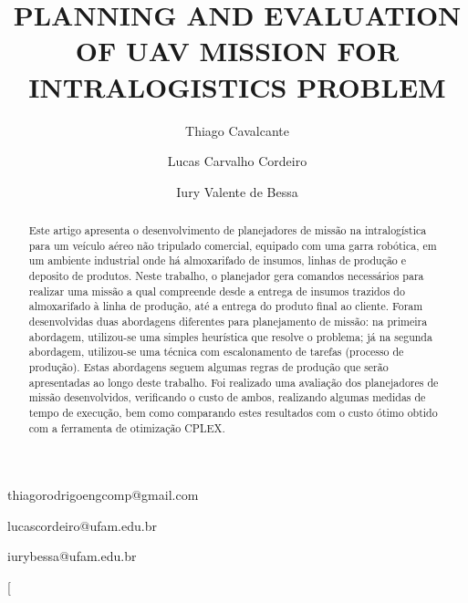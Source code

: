 \documentclass[conference,harvard,brazil,english]{sbatex}
\begin{document}

\title{PLANNING AND EVALUATION OF UAV MISSION FOR INTRALOGISTICS PROBLEM}

\author{Thiago Cavalcante}{thiagorodrigoengcomp@gmail.com}
\address{Graduate Program in Electrical Engineering, Federal University of Amazonas, Manaus, AM, Brazil}

\author{Lucas Carvalho Cordeiro}{lucascordeiro@ufam.edu.br}
\address{Department of Computer Science, University of Oxford, Oxford, United Kingdom}

\author{Iury Valente de Bessa}{iurybessa@ufam.edu.br}
\address{Department of Electricity, Federal University of Amazonas, Manaus, AM, Brazil}



\twocolumn[

\maketitle

\begin{abstract}
 Este artigo apresenta o desenvolvimento de planejadores de missão na intralogística para um veículo aéreo não tripulado comercial, equipado com uma garra robótica, em um ambiente industrial onde há almoxarifado de insumos, linhas de produção e deposito de produtos. Neste trabalho, o planejador gera comandos necessários para realizar uma missão a qual compreende desde a entrega de insumos trazidos do almoxarifado à linha de produção, até a entrega do produto final ao cliente. Foram desenvolvidas duas abordagens diferentes para planejamento de missão: na primeira abordagem, utilizou-se uma simples heurística que resolve o problema; já na segunda abordagem, utilizou-se uma técnica com escalonamento de tarefas (processo de produção). Estas abordagens seguem algumas regras de produção que serão apresentadas ao longo deste trabalho. Foi realizado uma avaliação dos planejadores de missão desenvolvidos, verificando o custo de ambos, realizando algumas medidas de tempo de execução, bem como comparando estes resultados com o custo ótimo obtido  com a ferramenta de otimização CPLEX.   \end{abstract}

\end{document}
